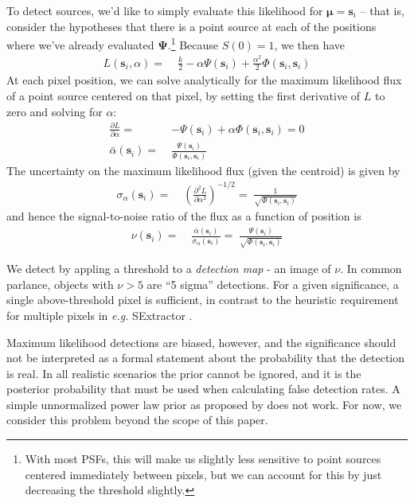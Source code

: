 \documentclass[10pt]{article}
\begin{document}
To detect sources, we'd like to simply evaluate this likelihood for $\bm{\mu} = \bm{s}_i$ -- that is, consider the hypotheses that there is a point source at each of the positions where we've already evaluated $\bm{\Psi}$.\footnote{With most PSFs, this will make us slightly less sensitive to point sources centered immediately between pixels, but we can account for this by just decreasing the threshold slightly.}  Because $S(0)=1$, we then have
\begin{align}
L(\bm{s}_i,\alpha) =\;& \frac{k}{2} -\alpha \Psi(\bm{s}_i)
    + \frac{\alpha^2}{2} \Phi(\bm{s}_i,\bm{s}_i)
\end{align}
At each pixel position, we can solve analytically for the maximum likelihood flux of a point source centered on that pixel, by setting the first derivative of $L$ to zero and solving for $\alpha$:
\begin{align}
\frac{\partial L}{\partial \alpha} =\;&
    -\Psi(\bm{s}_i) + \alpha \Phi(\bm{s}_i,\bm{s}_i) = 0\\
\bar{\alpha}(\bm{s}_i) =\;& \frac{\Psi(\bm{s}_i)}{\Phi(\bm{s}_i,\bm{s}_i)}
\end{align}
The uncertainty on the maximum likelihood flux (given the centroid) is given by
\begin{align}
\sigma_{\alpha}(\bm{s}_i) =\;&
    \left(\frac{\partial^2 L}{\partial \alpha^2}\right)^{-1/2}
    =\; \frac{1}{\sqrt{\Phi(\bm{s}_i,\bm{s}_i)}}
\end{align}
and hence the signal-to-noise ratio of the flux as a function of position is
\begin{align}
\nu(\bm{s}_i) =\;&
    \frac{\bar{\alpha}(\bm{s}_i)}{\sigma_{\alpha}(\bm{s}_i)} =\;
    \frac{\Psi(\bm{s}_i)}{\sqrt{\Phi(\bm{s}_i,\bm{s}_i)}}
\end{align}

We detect by appling a threshold to a \emph{detection map} - an image of $\nu$.  In common parlance, objects with $\nu>5$ are ``5 sigma'' detections.  For a given significance, a single above-threshold pixel is sufficient, in contrast to the heuristic requirement for multiple pixels in \textit{e.g.} SExtractor \citep{1996A&AS..117..393B}.

Maximum likelihood detections are biased, however, and the significance should not be interpreted as a formal statement about the probability that the detection is real.  In all realistic scenarios the prior cannot be ignored, and it is the posterior probability that must be used when calculating false detection rates.  A simple unnormalized power law prior as proposed by \cite{1998PASP..110..727H} does not work.  For now, we consider this problem beyond the scope of this paper.
\end{document}
